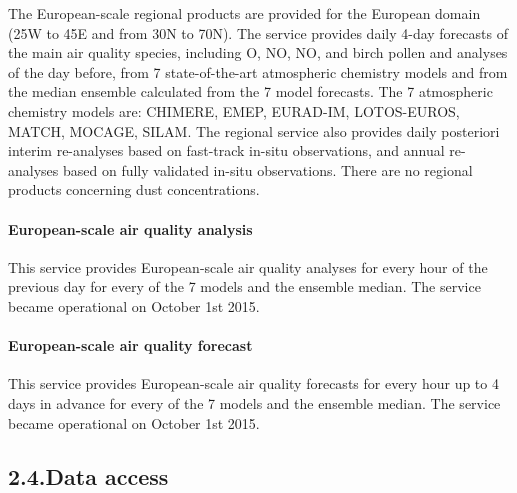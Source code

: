 \documentclass[9pt]{report}
\begin{document}
\noindent{}The European-scale regional products are provided for the European domain (25\textdegree{}W to 45\textdegree{}E and from 30\textdegree{}N to 70\textdegree{}N).
The service provides daily 4-day forecasts of the main air quality species, including O, NO, NO, and birch pollen and analyses of the day before, from 7 state-of-the-art atmospheric chemistry models and from the median ensemble calculated from the 7 model forecasts.
The 7 atmospheric chemistry models are: CHIMERE, EMEP, EURAD-IM, LOTOS-EUROS, MATCH, MOCAGE, SILAM.
The regional service also provides daily posteriori interim re-analyses based on fast-track in-situ observations, and annual re-analyses based on fully validated in-situ observations.
There are no regional products concerning dust concentrations.%

\paragraph{European-scale air quality analysis}\label{sec-european-scale-air-quality-analysis}%

\noindent{}\mdbr
{}This service provides European-scale air quality analyses for every hour of the previous day for every of the 7 models and the ensemble median.
The service became operational on October 1st 2015.%

\paragraph{European-scale air quality forecast}\label{sec-european-scale-air-quality-forecast}%

\noindent{}\mdbr
{}This service provides European-scale air quality forecasts for every hour up to 4 days in advance for every of the 7 models and the ensemble median.
The service became operational on October 1st 2015.%

\subsection{2.4.\hspace*{0.5em}Data access}\label{sec-data-access}%
\end{document}
